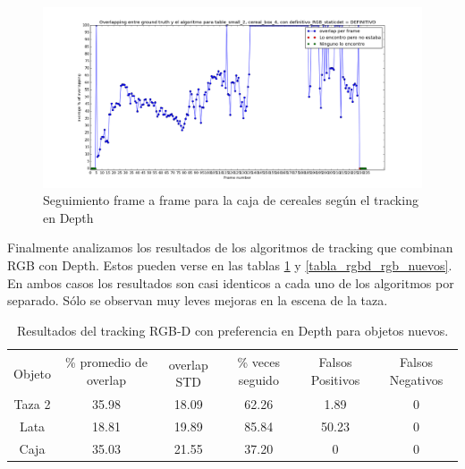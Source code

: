 \begin{figure}
	\centering
	\includegraphics[width=\textwidth]{img/seguimientoframeaframe-depth-nuevo-caja.png}
	\caption{Seguimiento frame a frame para la caja de cereales según el tracking en Depth}
	\label{frame_frame_d_nuevo}
\end{figure}


Finalmente analizamos los resultados de los algoritmos de tracking que combinan RGB con Depth. Estos pueden verse en las tablas \ref{tabla_rgbd_d_nuevos} y \ref{tabla_rgbd_rgb_nuevos}. En ambos casos los resultados son casi identicos a cada uno de los algoritmos por separado. Sólo se observan muy leves mejoras en la escena de la taza. 

\begin{table}[h]
    \begin{tabular}{|c|c|c|c|c|c|}
    \hline
    & \multirow{2}{2.4cm}{\% promedio de overlap} & & \multirow{2}{2cm}{\% veces seguido} & \multirow{2}{1.6cm}{Falsos Positivos} & \multirow{2}{1.6cm}{Falsos Negativos}\\
	Objeto & & overlap STD & & &\\
    \hline
    Taza 2  & 35.98      & 18.09       & 62.26             & 1.89             & 0\\
    \hline
    Lata    & 18.81      & 19.89       & 85.84             & 50.23            & 0\\
    \hline
    Caja    & 35.03      & 21.55       & 37.20             & 0                & 0\\
    \hline
    \end{tabular}
\caption{Resultados del tracking RGB-D con preferencia en Depth para objetos nuevos.}
\label{tabla_rgbd_d_nuevos}
\end{table}


